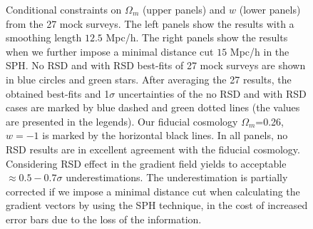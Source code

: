 \documentclass{emulateapj}
\begin{document}
\begin{figure}[tpb]
   \caption{ \label{fig_multlike} Conditional constraints on $\Omega_m$ (upper panels) and $w$ (lower panels) from the 27 mock surveys.
   The left panels show the results with a smoothing length $12.5$ Mpc/h.
   The right panels show the results when we further impose a minimal distance cut $15$ Mpc/h in the SPH.
   No RSD and with RSD best-fits of 27 mock surveys are shown in blue circles and green stars.
   After averaging the 27 results, the obtained best-fits and 1$\sigma$ uncertainties of the no RSD and with RSD cases 
   are marked by blue dashed and green dotted lines (the values are presented in the legends).
   Our fiducial cosmology $\Omega_m$=0.26, $w=-1$ is marked by the horizontal black lines.
   In all panels, no RSD results are in excellent agreement with the fiducial cosmology.
   Considering RSD effect in the gradient field yields to acceptable $\approx0.5-0.7\sigma$ underestimations.
   The underestimation is partially corrected if we impose a minimal distance cut when calculating the gradient vectors 
   by using the SPH technique, in the cost of increased error bars due to the loss of the information.}
\end{figure}
\end{document}
